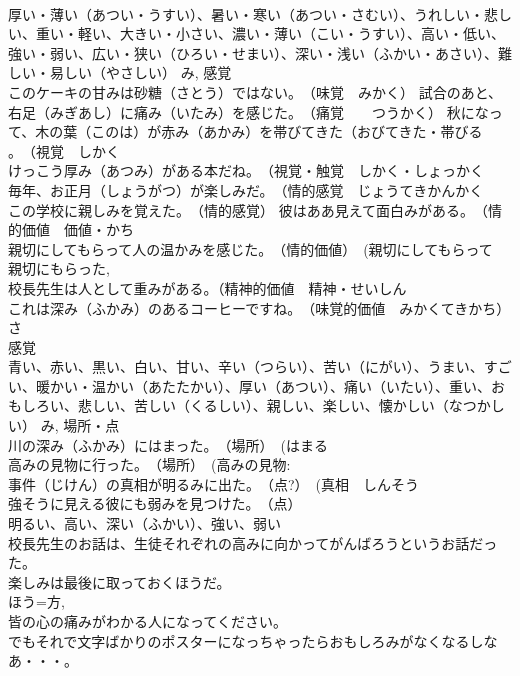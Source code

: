 \documentclass[8pt]{extreport}
\begin{document}
\begin{CJK}{UTF8}{min}
\\	厚い・薄い（あつい・うすい）、暑い・寒い（あつい・さむい）、うれしい・悲しい、重い・軽い、大きい・小さい、濃い・薄い（こい・うすい）、高い・低い、強い・弱い、広い・狭い（ひろい・せまい）、深い・浅い（ふかい・あさい）、難しい・易しい（やさしい） み, 感覚 
\\	このケーキの甘みは砂糖（さとう）ではない。　（味覚　みかく） 試合のあと、右足（みぎあし）に痛み（いたみ）を感じた。　（痛覚　　つうかく） 秋になって、木の葉（このは）が赤み（あかみ）を帯びてきた（おびてきた・帯びる 
\\	。　（視覚　しかく 
\\	けっこう厚み（あつみ）がある本だね。　（視覚・触覚　しかく・しょっかく 
\\	毎年、お正月（しょうがつ）が楽しみだ。　（情的感覚　じょうてきかんかく 
\\	この学校に親しみを覚えた。　（情的感覚） 彼はああ見えて面白みがある。　（情的価値　価値・かち　
\\	親切にしてもらって人の温かみを感じた。　（情的価値）　(親切にしてもらって 
\\	親切にもらった, 
\\	校長先生は人として重みがある。（精神的価値　精神・せいしん 
\\	これは深み（ふかみ）のあるコーヒーですね。　（味覚的価値　みかくてきかち） 
\\	さ 
\\	感覚 
\\	青い、赤い、黒い、白い、甘い、辛い（つらい）、苦い（にがい）、うまい、すごい、暖かい・温かい（あたたかい）、厚い（あつい）、痛い（いたい）、重い、おもしろい、悲しい、苦しい（くるしい）、親しい、楽しい、懐かしい（なつかしい） み, 場所・点 
\\	川の深み（ふかみ）にはまった。　（場所）　(はまる　
\\	高みの見物に行った。　（場所）　(高みの見物: 
\\	事件（じけん）の真相が明るみに出た。　（点?）　(真相　しんそう 
\\	強そうに見える彼にも弱みを見つけた。　（点） 
\\	明るい、高い、深い（ふかい）、強い、弱い 
\\	校長先生のお話は、生徒それぞれの高みに向かってがんばろうというお話だった。 
\\	楽しみは最後に取っておくほうだ。 
\\	ほう=方, 
\\	皆の心の痛みがわかる人になってください。 
\\	でもそれで文字ばかりのポスターになっちゃったらおもしろみがなくなるしなあ・・・。 

\end{CJK}
\end{document}
